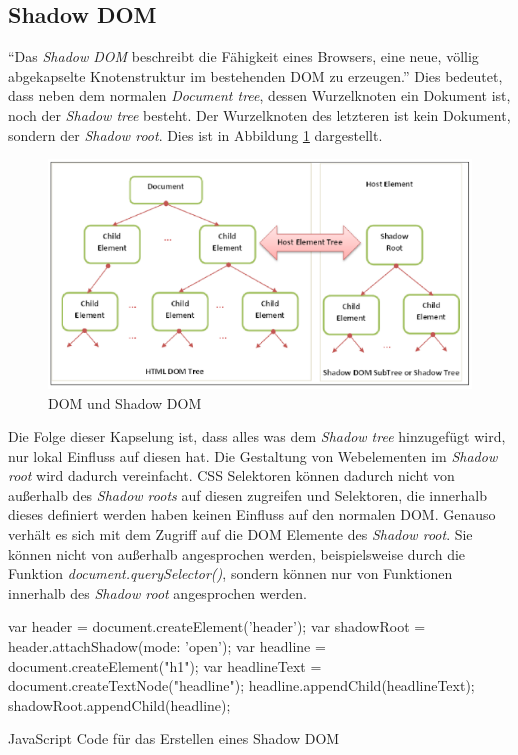 \documentclass[12pt, paper=a4, bibtotoc, toc=listof, headsepline=true]{scrreprt}
\begin{document}
		\subsection{Shadow DOM}
		\enquote{Das \emph{Shadow \ac{DOM}} beschreibt die Fähigkeit eines Browsers, eine neue, völlig abgekapselte Knotenstruktur im bestehenden \ac{DOM} zu erzeugen.}\cite[Kap. 11.1.4]{gasston2014moderne} Dies bedeutet, dass neben dem normalen \emph{Document tree}, dessen Wurzelknoten ein Dokument ist, noch der \emph{Shadow tree} besteht. Der Wurzelknoten des letzteren ist kein Dokument, sondern der \emph{Shadow root}. Dies ist in Abbildung \ref{img:shaDom} dargestellt.\cite[vgl. S.22]{patel2015learning} 
		\begin{figure}
			\centering
			\includegraphics[width=\textwidth,height=\textheight,keepaspectratio]{shaDom.png}
			\caption{DOM und Shadow \ac{DOM} \cite[S. 22]{patel2015learning}}
			\label{img:shaDom}
		\end{figure}
		Die Folge dieser Kapselung ist, dass alles was dem \emph{Shadow tree} hinzugefügt wird, nur lokal Einfluss auf diesen hat. Die Gestaltung von Webelementen im \emph{Shadow root} wird dadurch vereinfacht.
		\ac{CSS} Selektoren können dadurch nicht von außerhalb des \emph{Shadow roots} auf diesen zugreifen und Selektoren, die innerhalb dieses definiert werden haben keinen Einfluss auf den normalen \ac{DOM}. Genauso verhält es sich mit dem Zugriff auf die \ac{DOM} Elemente des \emph{Shadow root}. Sie können nicht von außerhalb angesprochen werden, beispielsweise durch die Funktion \emph{document.querySelector()}, sondern können nur von Funktionen innerhalb des \emph{Shadow root} angesprochen werden.\cite[vgl.]{Bidelman2016}
		\begin{listing}
			\begin{JavaScriptcode*}{}
var header = document.createElement('header');
var shadowRoot = header.attachShadow({mode: 'open'});
var headline = document.createElement("h1");
var headlineText = document.createTextNode("headline");
headline.appendChild(headlineText);
shadowRoot.appendChild(headline);
			\end{JavaScriptcode*}
				\caption{JavaScript Code für das Erstellen eines Shadow DOM}
				\label{lst:javShaDom}
		\end{listing}
\end{document}
